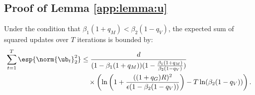 \documentclass[11pt, letterpaper]{article}
\begin{document}
\subsection{Proof of Lemma \ref{app:lemma:u}}
\begin{lemma}[Upper bound of $\sum_{t=1}^T\esp{\norm{\ub_t}^2_2}$]
\label{app:lemma:u}
Under the condition that $\beta_1(1+q_M) < \beta_2(1-q_V)$, the expected sum of squared updates over $T$ iterations is bounded by:
\begin{align}
    \sum_{t=1}^T\esp{\norm{\ub_t}^2_2} &\le \frac{d}{(1 - \beta_1(1+q_M))(1 - \frac{\beta_1(1+q_M)}{\beta_2(1-q_V)})} \nonumber \\ 
    &\quad \times \left(\ln\left(1 + \frac{((1+q_G)R)^2}{\epsilon(1-\beta_2(1-q_V))}\right) - T\ln(\beta_2(1-q_V))\right). \label{app:eq:sum_ratio_u_lemma10}
\end{align}
\end{lemma}
\end{document}
